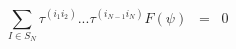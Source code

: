 \begin{equation}
\sum_{I \in S_N} \tau^{(
i_1 i_2 )} ... \tau^{( i_{N-1} i_N )} F( \psi ) \;\; =\;\; 0
\label{eq:3.6}
\end{equation}

